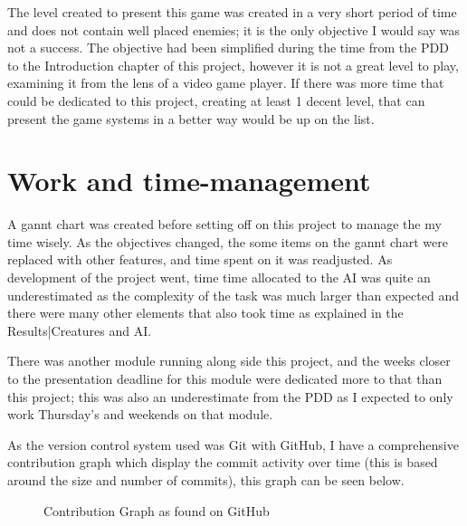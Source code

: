 \documentclass[11pt]{report}
\begin{document}
The level created to present this game was created in a very short period of time and does not contain well placed enemies; it is the only objective I would say was not a success. The objective had been simplified during the time from the PDD to the Introduction chapter of this project, however it is not a great level to play, examining it from the lens of a video game player. If there was more time that could be dedicated to this project, creating at least 1 decent level, that can present the game systems in a better way would be up on the list.

\section{Work and time-management}
A gannt chart was created before setting off on this project to manage the my time wisely. As the objectives changed, the some items on the gannt chart were replaced with other features, and time spent on it was readjusted. As development of the project went, time time allocated to the AI was quite an underestimated as the complexity of the task was much larger than expected and there were many other elements that also took time as explained in the Results|Creatures and AI.

There was another module running along side this project, and the weeks closer to the presentation deadline for this module were dedicated more to that than this project; this was also an underestimate from the PDD as I expected to only work Thursday's and weekends on that module.

As the version control system used was Git with GitHub, I have a comprehensive contribution graph which display the commit activity over time (this is based around the size and number of commits), this graph can be seen below.
\begin{figure}[H]
    \centering
    \caption{Contribution Graph as found on GitHub}
\end{figure}
\end{document}
